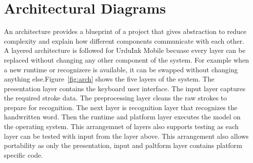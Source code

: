 \documentclass[12pt,a4paper]{report}
\begin{document}
\section{Architectural Diagrams}
An architecture provides a blueprint of a project that gives abstraction to reduce complexity and explain how different components communicate with each other. A layered architecture is followed for UrduInk Mobile becuase every layer can be replaced without changing any other component of the system. For example when a new runtime or recognizere is available, it can be swapped without changing anything else.Figure~\ref{fig:arch} shows the five layers of the system. The presentation layer contains the keyboard user interface. The input layer captures the required stroke data. The preprocessing layer cleans the raw strokes to prepare for recognition. The next layer is recognition layer that recognizes the handwritten word. Then the runtime and platform layer executes the model on the operating system. This arrangemnet of layers also supports testing as each layer can be tested with input from the layer above. This arrangement also allows portability as only the presentation, input and paltform layer contains platform specific code.
\end{document}
